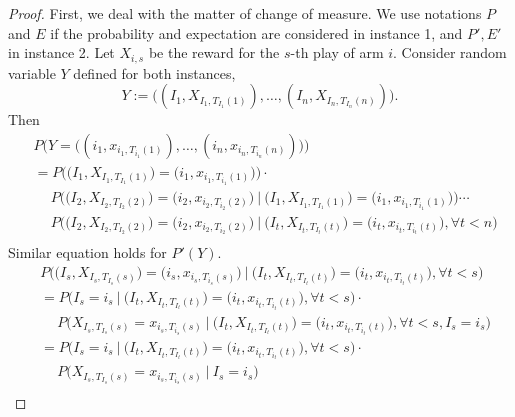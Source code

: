 \begin{proof}
    First, we deal with the matter of change of measure.
    We use notations $P$ and $E$ if the probability and expectation are considered
    in instance 1, and $P', E'$ in instance 2.
    Let $X_{i,s}$ be the reward for the $s$-th play of arm $i$.
    Consider random variable $Y$ defined for both instances,
    \begin{equation}
        Y := \big((I_1, X_{I_1, T_{I_1}(1)}),\dots,(I_n, X_{I_n, T_{I_n}(n)})\big).
    \end{equation}
    Then
    \begin{equation}
    \begin{split}
        &P\Big(Y=\big((i_1, x_{i_1, T_{i_1}(1)}),\dots,(i_n, x_{i_n, T_{i_n}(n)})\big)\Big) \\
            &= P\Big(\big(I_1, X_{I_1, T_{I_1}(1)}\big)=\big(i_1, x_{i_1, T_{i_1}(1)}\big)\Big) \cdot \\
            &\quad~  P\Big(\big(I_2, X_{I_2, T_{I_2}(2)}\big)=\big(i_2, x_{i_2, T_{i_2}(2)}\big)~\Big|~
                \big(I_1, X_{I_1, T_{I_1}(1)}\big)=\big(i_1, x_{i_1, T_{i_1}(1)}\big)\Big) \cdots \\
            &\quad~  P\Big(\big(I_2, X_{I_2, T_{I_2}(2)}\big)=\big(i_2, x_{i_2, T_{i_2}(2)}\big)~\Big|~
                \big(I_t, X_{I_t, T_{I_t}(t)}\big)=\big(i_t, x_{i_t, T_{i_t}(t)}\big), \forall t<n\Big) \\
    \end{split}
    \end{equation}
    Similar equation holds for $P'(Y)$.
    \begin{equation}
        \begin{split}
            &P\Big(\big(I_s, X_{I_s, T_{I_s}(s)}\big)=\big(i_s, x_{i_s, T_{i_s}(s)}\big)~\Big|~
            \big(I_t, X_{I_t, T_{I_t}(t)}\big)=\big(i_t, x_{i_t, T_{i_t}(t)}\big), \forall t<s\Big) \\
            &=P\Big(I_s=i_s~\Big|~
            \big(I_t, X_{I_t, T_{I_t}(t)}\big)=\big(i_t, x_{i_t, T_{i_t}(t)}\big), \forall t<s\Big) \cdot \\
            &\quad~P\Big(X_{I_s, T_{I_s}(s)}=x_{i_s, T_{i_s}(s)}~\Big|~
            \big(I_t, X_{I_t, T_{I_t}(t)}\big)=\big(i_t, x_{i_t, T_{i_t}(t)}\big), \forall t<s, I_s=i_s\Big) \\
            &=P\Big(I_s=i_s~\Big|~
            \big(I_t, X_{I_t, T_{I_t}(t)}\big)=\big(i_t, x_{i_t, T_{i_t}(t)}\big), \forall t<s\Big) \cdot \\
            &\quad~P\Big(X_{I_s, T_{I_s}(s)}=x_{i_s, T_{i_s}(s)}~\Big|~I_s=i_s\Big) \\

\end{split}
\end{equation}
\end{proof}
